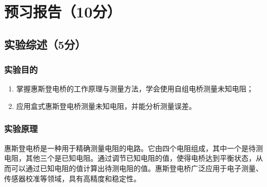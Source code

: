 \documentclass[]{../template/Report}%
\begin{document}
\maketitle%

\section{预习报告（10分）}

\subsection{实验综述（5分）}
\subsubsection{实验目的}

\begin{enumerate}
    \item 掌握惠斯登电桥的工作原理与测量方法，学会使用自组电桥测量未知电阻；
    \item 应用盒式惠斯登电桥测量未知电阻，并能分析测量误差。
\end{enumerate}

\subsubsection{实验原理}
惠斯登电桥是一种用于精确测量电阻的电路。它由四个电阻组成，其中一个是待测电阻，其他三个是已知电阻。通过调节已知电阻的值，使得电桥达到平衡状态，从而可以通过已知电阻的值计算出待测电阻的值。惠斯登电桥广泛应用于电子测量、传感器校准等领域，具有高精度和稳定性。
\end{document}
